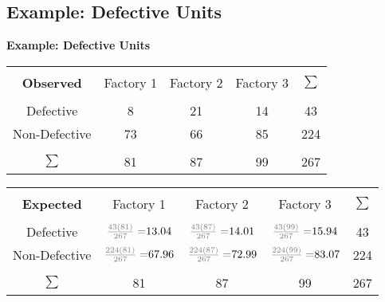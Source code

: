 \documentclass[compress]{beamer}        %
\makeatletter
\newcommand{\tcb}{\textcolor{beamer@blendedblue}}
\newcommand{\tcg}{\textcolor{gray}}
\makeatother
\begin{document}
\subsection{Example: Defective Units}
\begin{frame}{\bf \tcb{Example: Defective Units}}

\begin{center}
\begin{tabular}{|c|ccc|c|}
\hline
&&&&\\[-0.3cm]
 {\bf Observed}                 & Factory 1 & Factory 2 & Factory 3 & $\sum$ \\[0.1cm]
\hline
&&&&\\[-0.3cm]
Defective      &  8        &  21       &  14       & 43 \\[0.2cm]
Non-Defective  &  73       &  66       &  85       & 224 \\[0.1cm]
\hline
&&&&\\[-0.3cm]
$\sum$              &  81       &  87       &  99       & 267 \\[0.1cm]
\hline
\end{tabular}
\end{center}
\begin{adjustwidth}{-0.3cm}{0cm}
\begin{tabular}{|c|ccc|c|}
\hline
&&&&\\[-0.3cm]
 {\bf Expected}                 & Factory 1 & Factory 2 & Factory 3 & $\sum$ \\[0.1cm]
\hline
&&&&\\[-0.3cm]
Defective      &  $\tcg{\frac{43(81)}{267}=} 13.04$        &  $\tcg{\frac{43(87)}{267}=}14.01$       &  $\tcg{\frac{43(99)}{267}=}15.94$       & 43 \\[0.2cm]
Non-Defective  & $\tcg{\frac{224(81)}{267}=}67.96$       &  $\tcg{\frac{224(87)}{267}=}72.99$  &  $\tcg{\frac{224(99)}{267}=}83.07$       & 224 \\[0.1cm]
\hline
&&&&\\[-0.3cm]
$\sum$              &  81       &  87       &  99       & 267 \\[0.1cm]
\hline
\end{tabular}
\end{adjustwidth}

\end{frame}
\end{document}
